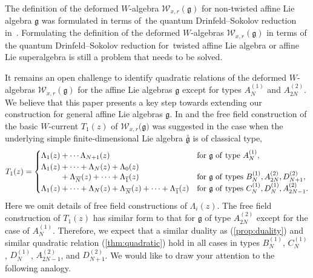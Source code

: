 \documentclass[pdftex]{sigma}
\numberwithin{equation}{section}
\begin{document}
The definition of the deformed $W$-algebra ${\mathcal W}_{x,r}(\mathfrak{g})$
for non-twisted affine Lie algebra ${\mathfrak g}$
was formulated in terms of~the quantum Drinfeld--Sokolov reduction in~\cite{Sevostyanov}.
Formulating the definition of
the deformed $W$-algebras ${\mathcal W}_{x,r}({\mathfrak g})$
in terms of the quantum Drinfeld--Sokolov reduction
for~twisted affine Lie algebra or affine Lie superalgebra
\cite{Ding-Feigin,Feigin-Jimbo-Mukhin-Vilkoviskiy,
Harada-Matsuo-Noshita-Watanabe, Kojima2, Kojima1} is still a problem that needs to be solved.

It remains an open challenge
to identify quadratic relations of the deformed $W$-algebras
${\mathcal W}_{x,r}({\mathfrak g})$ for the affine Lie algebras ${\mathfrak g}$
except for types $A_N^{(1)}$ and $A_{2N}^{(2)}$. We believe
that this paper presents a key step towards extending our construction for general affine Lie algebras
${\mathfrak g}$. In \cite{Frenkel-Reshetikhin1} and
\cite{Feigin-Jimbo-Mukhin-Vilkoviskiy} the free field construction of the basic $W$-current $T_1(z)$
of ${\mathcal W}_{x,r}\big({\mathfrak g}\big)$
was suggested in the case when
the underlying simple finite-dimensional Lie algebra
$\stackrel{\circ}{\mathfrak g}$ is of classical type,
\begin{gather*}
T_1(z)=\begin{cases}
\Lambda_1(z)+\cdots \Lambda_{N+1}(z)&{{\rm for}~{\mathfrak g}~{\rm of~type}}~A_N^{(1)},
\\
\Lambda_1(z)+\cdots+\Lambda_N(z)+\Lambda_0(z)
\\[-.5ex]
\hphantom{\Lambda_1(z)}+\Lambda_{\overline{N}}(z)+\cdots+\Lambda_{\overline{1}}(z)&
{{\rm for}~{\mathfrak g}~{\rm of~types}}~B_N^{(1)}, A_{2N}^{(2)}, D_{N+1}^{(2)},
\\
\Lambda_1(z)+\cdots+\Lambda_N(z)+
\Lambda_{\overline{N}}(z)+\cdots+\Lambda_{\overline{1}}(z)
&{{\rm for}~{\mathfrak g}~{\rm of~types}}~C_N^{(1)}, D_N^{(1)}, A_{2N-1}^{(2)}.
\end{cases}
\end{gather*}
Here we omit details of free field constructions of $\Lambda_i(z)$.
The free field construction of $T_1(z)$ has similar form to that
for ${\mathfrak g}$ of type $A_{2N}^{(2)}$
except for the case of $A_N^{(1)}$. Therefore, we expect that
a similar duality as (\ref{prop:duality}) and similar quadratic relation (\ref{thm:quadratic})
hold in all cases in types $B_N^{(1)}$, $C_N^{(1)}$, $D_N^{(1)}$, $A_{2N-1}^{(2)}$, and
$D_{N+1}^{(2)}$. We would like to draw your attention to the following analogy.
\end{document}
